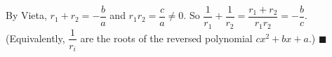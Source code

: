 By Vieta, $r_1+r_2=-\dfrac ba$ and $r_1r_2=\dfrac ca\ne0$. So $\dfrac1{r_1}+\dfrac1{r_2}=\dfrac{r_1+r_2}{r_1r_2}=-\dfrac bc$. (Equivalently, $\dfrac1{r_i}$ are the roots of the reversed polynomial $cx^2+bx+a$.) $\blacksquare$
